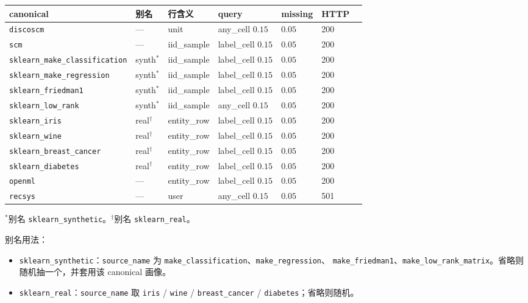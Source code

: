 \documentclass[11pt,a4paper,fontset=none]{ctexart}
\begin{document}
{\footnotesize
\begin{center}
\begin{tabular}{@{}llllllc@{}}
\toprule
canonical & 别名 & 行含义 & query & missing & HTTP \\
\midrule
\texttt{discoscm} & --- & unit & any\_cell $0.15$ & $0.05$ & 200 \\
\texttt{scm} & --- & iid\_sample & label\_cell $0.15$ & $0.05$ & 200 \\
\texttt{sklearn\_make\_classification} & synth$^*$ & iid\_sample & label\_cell $0.15$ & $0.05$ & 200 \\
\texttt{sklearn\_make\_regression} & synth$^*$ & iid\_sample & label\_cell $0.15$ & $0.05$ & 200 \\
\texttt{sklearn\_friedman1} & synth$^*$ & iid\_sample & label\_cell $0.15$ & $0.05$ & 200 \\
\texttt{sklearn\_low\_rank} & synth$^*$ & iid\_sample & any\_cell $0.15$ & $0.05$ & 200 \\
\texttt{sklearn\_iris} & real$^\dagger$ & entity\_row & label\_cell $0.15$ & $0.05$ & 200 \\
\texttt{sklearn\_wine} & real$^\dagger$ & entity\_row & label\_cell $0.15$ & $0.05$ & 200 \\
\texttt{sklearn\_breast\_cancer} & real$^\dagger$ & entity\_row & label\_cell $0.15$ & $0.05$ & 200 \\
\texttt{sklearn\_diabetes} & real$^\dagger$ & entity\_row & label\_cell $0.15$ & $0.05$ & 200 \\
\texttt{openml} & --- & entity\_row & label\_cell $0.15$ & $0.05$ & 200 \\
\texttt{recsys} & --- & user & any\_cell $0.15$ & $0.05$ & 501 \\
\bottomrule
\end{tabular}
\end{center}
}
{\footnotesize $^*$别名 \texttt{sklearn\_synthetic}。$^\dagger$别名 \texttt{sklearn\_real}。}

别名用法：
\begin{itemize}
  \item \texttt{sklearn\_synthetic}：\texttt{source\_name} 为
        \texttt{make\_classification}、\texttt{make\_regression}、
        \texttt{make\_friedman1}、\texttt{make\_low\_rank\_matrix}。省略则随机抽一个，并套用该 canonical 画像。
  \item \texttt{sklearn\_real}：\texttt{source\_name} 取
        \texttt{iris} / \texttt{wine} / \texttt{breast\_cancer} / \texttt{diabetes}；省略则随机。
\end{itemize}
\end{document}
